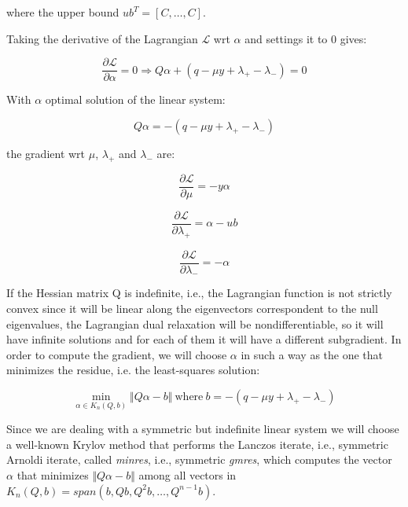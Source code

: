 where the upper bound $ub^T = [C, \dots, C]$.

Taking the derivative of the Lagrangian $\mathcal{L}$ wrt $\alpha$ and settings it to 0 gives:

\begin{equation} \label{eq:svc_lagrangian_der_a}
	\frac{\partial \mathcal{L}}{\partial \alpha}=0\Rightarrow Q \alpha + (q - \mu y + \lambda_+ - \lambda_-) = 0
\end{equation}

With $\alpha$ optimal solution of the linear system:

\begin{equation} \label{eq:svc_lagrangian_sol}
    Q \alpha = - (q - \mu y + \lambda_+ - \lambda_-)
\end{equation}

the gradient wrt $\mu$, $\lambda_+$ and $\lambda_-$ are:

\begin{equation} \label{eq:svc_lagrangian_der_mu}
	\frac{\partial \mathcal{L}}{\partial \mu}=-y \alpha
\end{equation}

\begin{equation} \label{eq:svc_lagrangian_der_lp}
	\frac{\partial \mathcal{L}}{\partial \lambda_+}=\alpha - ub
\end{equation}

\begin{equation} \label{eq:svc_lagrangian_der_lm}
    \frac{\partial \mathcal{L}}{\partial \lambda_-}=-\alpha
\end{equation}

If the Hessian matrix Q is indefinite, i.e., the Lagrangian function is not strictly convex since it will be linear along the eigenvectors correspondent to the null eigenvalues, the Lagrangian dual relaxation will be nondifferentiable, so it will have infinite solutions and for each of them it will have a different subgradient. In order to compute the gradient, we will choose $\alpha$ in such a way as the one that minimizes the residue, i.e. the least-squares solution:

\begin{equation} \label{eq:svc_lagrangian_krylov_sol}
	\min_{\alpha \in K_n(Q, b)} \Vert Q \alpha - b \Vert \ \text{where} \ b = - (q - \mu y + \lambda_+ - \lambda_-)
\end{equation}

Since we are dealing with a symmetric but indefinite linear system we will choose a well-known Krylov method that performs the Lanczos iterate, i.e., symmetric Arnoldi iterate, called \emph{minres}, i.e., symmetric \emph{gmres}, which computes the vector $\alpha$ that minimizes $\Vert Q \alpha - b \Vert$ among all vectors in $K_n(Q, b) = span(b, Qb, Q^2b, \dots, Q^{n-1}b)$.

